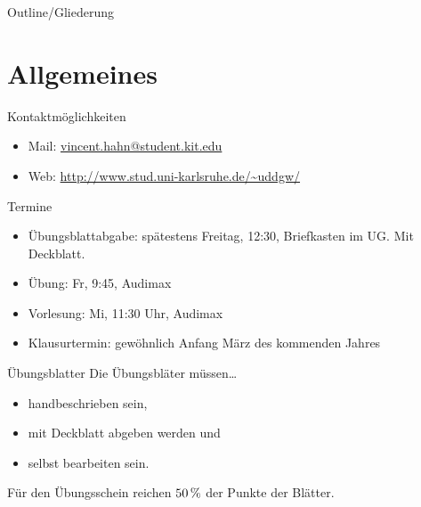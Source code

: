 
\subtitle{Foliensatz 01}
\date{25. Oktober 2012}



\begin{frame}
\titlepage
\end{frame}

\begin{frame}{Outline/Gliederung}
\tableofcontents
\end{frame}

\section{Allgemeines}
\begin{frame}{Kontaktmöglichkeiten}
\begin{itemize}
    \item Mail: \href{mailto:vincent.hahn@student.kit.edu}{vincent.hahn@student.kit.edu}
\pause
    \item Web: \url{http://www.stud.uni-karlsruhe.de/~uddgw/}
\end{itemize}
\end{frame}

\begin{frame}{Termine}
    \begin{itemize}
    \item Übungsblattabgabe: spätestens Freitag, 12:30, Briefkasten im UG. Mit Deckblatt.
    \pause
    \item Übung: Fr, 9:45, Audimax
    \item Vorlesung: Mi, 11:30 Uhr, Audimax
    \pause
    \item Klausurtermin: gewöhnlich Anfang März des kommenden Jahres
    \end{itemize}
\end{frame}

\begin{frame}{Übungsblatter}
    Die Übungsbläter müssen\dots
    \begin{itemize}
        \item handbeschrieben sein,
        \item mit Deckblatt abgeben werden und
        \item selbst bearbeiten sein.
    \end{itemize}
    Für den Übungsschein reichen $\unit[50]{\%}$ der Punkte der Blätter.
\end{frame}

